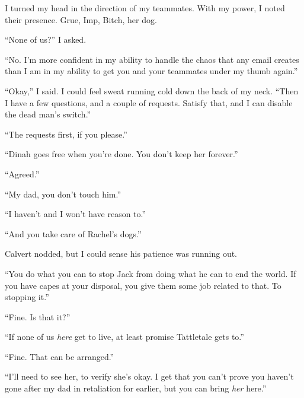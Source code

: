 I turned my head in the direction of my teammates.  With my power, I noted their presence.  Grue, Imp, Bitch, her dog.



``None of us?'' I asked.



``No.  I'm more confident in my ability to handle the chaos that any email creates than I am in my ability to get you and your teammates under my thumb again.''



``Okay,'' I said.  I could feel sweat running cold down the back of my neck.  ``Then I have a few questions, and a couple of requests.  Satisfy that, and I can disable the dead man's switch.''



``The requests first, if you please.''



``Dinah goes free when you're done.  You don't keep her forever.''



``Agreed.''



``My dad, you don't touch him.''



``I haven't and I won't have reason to.''



``And you take care of Rachel's dogs.''



Calvert nodded, but I could sense his patience was running out.



``You do what you can to stop Jack from doing what he can to end the world.  If you have capes at your disposal, you give them some job related to that.  To stopping it.''



``Fine.  Is that it?''



``If none of us \emph{here} get to live, at least promise Tattletale gets to.''



``Fine.  That can be arranged.''



``I'll need to see her, to verify she's okay.  I get that you can't prove you haven't gone after my dad in retaliation for earlier, but you can bring \emph{her} here.''



